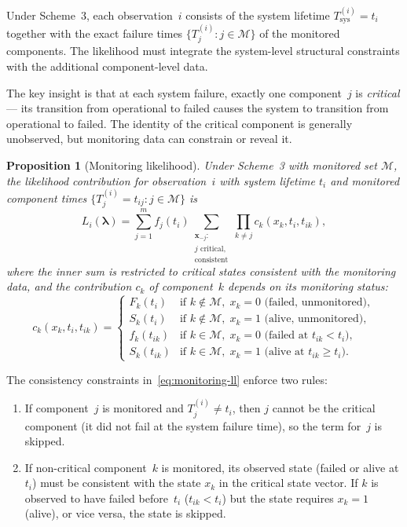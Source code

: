 \documentclass[12pt]{article}
\newtheorem{proposition}[theorem]{Proposition}
\theoremstyle{definition}
\theoremstyle{remark}
\newcommand{\blam}{\boldsymbol{\lambda}}
\begin{document}
Under Scheme~3, each observation~$i$ consists of the system lifetime
$T_{\mathrm{sys}}^{(i)} = t_i$ together with the exact failure times
$\{T_j^{(i)} : j \in \mathcal{M}\}$ of the monitored components.
The likelihood must integrate the system-level structural constraints
with the additional component-level data.

The key insight is that at each system failure, exactly one
component~$j$ is \emph{critical} --- its transition from operational
to failed causes the system to transition from operational to failed.
The identity of the critical component is generally unobserved, but
monitoring data can constrain or reveal it.

\begin{proposition}[Monitoring likelihood]\label{prop:monitoring-ll}
  Under Scheme~3 with monitored set $\mathcal{M}$, the likelihood
  contribution for observation~$i$ with system lifetime $t_i$ and
  monitored component times $\{T_j^{(i)} = t_{ij} : j \in \mathcal{M}\}$ is
  \begin{equation}\label{eq:monitoring-ll}
    L_i(\blam) = \sum_{j=1}^{m} f_j(t_i)
      \sum_{\substack{\mathbf{x}_{-j}:\\ j \text{ critical},\\
        \text{consistent}}}
      \prod_{k \neq j} c_k(x_k, t_i, t_{ik}),
  \end{equation}
  where the inner sum is restricted to critical states consistent with
  the monitoring data, and the contribution $c_k$ of component~$k$ depends
  on its monitoring status:
  \begin{equation}\label{eq:comp-contributions}
    c_k(x_k, t_i, t_{ik}) = \begin{cases}
      F_k(t_i) & \text{if } k \notin \mathcal{M},\; x_k = 0 \text{ (failed, unmonitored)}, \\
      S_k(t_i) & \text{if } k \notin \mathcal{M},\; x_k = 1 \text{ (alive, unmonitored)}, \\
      f_k(t_{ik}) & \text{if } k \in \mathcal{M},\; x_k = 0 \text{ (failed at } t_{ik} < t_i\text{)}, \\
      S_k(t_{ik}) & \text{if } k \in \mathcal{M},\; x_k = 1 \text{ (alive at } t_{ik} \geq t_i\text{)}.
    \end{cases}
  \end{equation}
\end{proposition}

The consistency constraints in~\eqref{eq:monitoring-ll} enforce two
rules:
\begin{enumerate}
  \item[(C1)] If component~$j$ is monitored and $T_j^{(i)} \neq t_i$,
    then $j$ cannot be the critical component (it did not fail at the
    system failure time), so the term for~$j$ is skipped.
  \item[(C2)] If non-critical component~$k$ is monitored, its observed
    state (failed or alive at $t_i$) must be consistent with the state
    $x_k$ in the critical state vector.  If $k$ is observed to have
    failed before~$t_i$ ($t_{ik} < t_i$) but the state
    requires $x_k = 1$ (alive), or vice versa, the state is skipped.
\end{enumerate}
\end{document}
